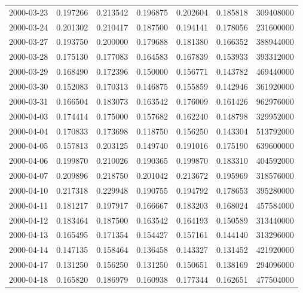 \begin{tabular}{lrrrrrr}
2000-03-23 &    0.197266 &    0.213542 &    0.196875 &    0.202604 &    0.185818 &   309408000 \\
2000-03-24 &    0.201302 &    0.210417 &    0.187500 &    0.194141 &    0.178056 &   231600000 \\
2000-03-27 &    0.193750 &    0.200000 &    0.179688 &    0.181380 &    0.166352 &   388944000 \\
2000-03-28 &    0.175130 &    0.177083 &    0.164583 &    0.167839 &    0.153933 &   393312000 \\
2000-03-29 &    0.168490 &    0.172396 &    0.150000 &    0.156771 &    0.143782 &   469440000 \\
2000-03-30 &    0.152083 &    0.170313 &    0.146875 &    0.155859 &    0.142946 &   361920000 \\
2000-03-31 &    0.166504 &    0.183073 &    0.163542 &    0.176009 &    0.161426 &   962976000 \\
2000-04-03 &    0.174414 &    0.175000 &    0.157682 &    0.162240 &    0.148798 &   329952000 \\
2000-04-04 &    0.170833 &    0.173698 &    0.118750 &    0.156250 &    0.143304 &   513792000 \\
2000-04-05 &    0.157813 &    0.203125 &    0.149740 &    0.191016 &    0.175190 &   639600000 \\
2000-04-06 &    0.199870 &    0.210026 &    0.190365 &    0.199870 &    0.183310 &   404592000 \\
2000-04-07 &    0.209896 &    0.218750 &    0.201042 &    0.213672 &    0.195969 &   318576000 \\
2000-04-10 &    0.217318 &    0.229948 &    0.190755 &    0.194792 &    0.178653 &   395280000 \\
2000-04-11 &    0.181217 &    0.197917 &    0.166667 &    0.183203 &    0.168024 &   457584000 \\
2000-04-12 &    0.183464 &    0.187500 &    0.163542 &    0.164193 &    0.150589 &   313440000 \\
2000-04-13 &    0.165495 &    0.171354 &    0.154427 &    0.157161 &    0.144140 &   313296000 \\
2000-04-14 &    0.147135 &    0.158464 &    0.136458 &    0.143327 &    0.131452 &   421920000 \\
2000-04-17 &    0.131250 &    0.156250 &    0.131250 &    0.150651 &    0.138169 &   294096000 \\
2000-04-18 &    0.165820 &    0.186979 &    0.160938 &    0.177344 &    0.162651 &   477504000 \\

\end{tabular}
